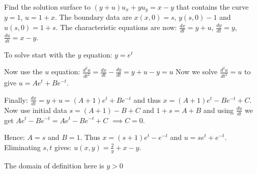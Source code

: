 Find the solution surface to $(y+u)u_x + yu_y = x-y$ that contains the curve $y=1$, $u=1+x$. The boundary data are $x(x,0) = s$, $y(s,0) - 1$ and $u(s,0) = 1+s$. The characteristic equations are now: $\frac{dx}{dt} = y + u$, $\frac{dy}{dt} = y$, $\frac{du}{dt} = x-y$.

To solve start with the $y$ equation: $y = e^t$

Now use the $u$ equation: $\frac{d^2 u}{dt^2} = \frac{dx}{dt} - \frac{dy}{dt} = y + u - y = u$ Now we solve $\frac{d^2 u}{dt^2} = u$ to give $u = Ae^t + B e^{-t}$.

Finally: $\frac{dx}{dt} = y + u = (A+1)e^t + B e^{-t}$ and thus $x = (A+1)e^t - Be^{-t} +C$. Now use initial data $s=(A+1) -B +C$ and $1+s = A+B$ and using $\frac{du}{dt}$ we get $Ae^t - Be^{-t} = Ae^t - Be^{-t} + C$ $\implies C = 0$.

Hence: $A=s$ and $B=1$. Thus $x=(s+1)e^t - e^{-t}$ and $u=se^t + e^{-t}$. Eliminating $s,t$ gives: $u(x,y) = \frac{2}{y} + x - y$.

The domain of definition here is $y>0$